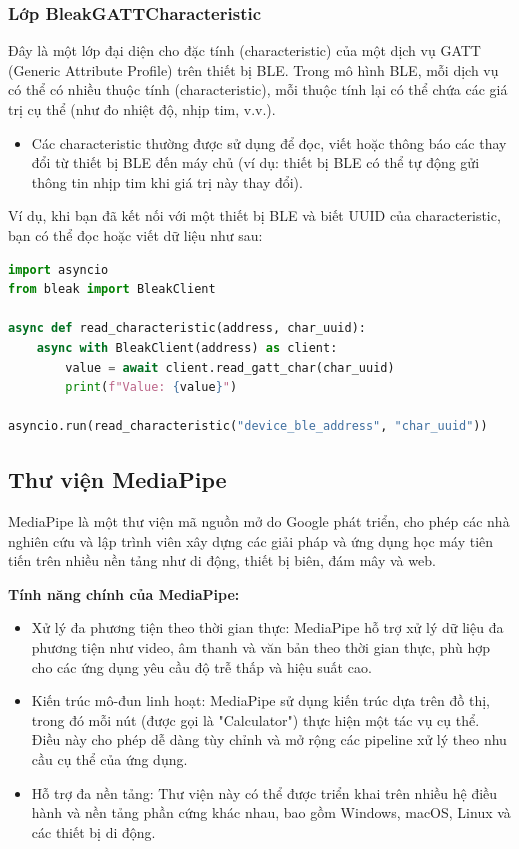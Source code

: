 \subsubsection{Lớp BleakGATTCharacteristic}
Đây là một lớp đại diện cho đặc tính (characteristic) của một dịch vụ GATT (Generic Attribute Profile) trên thiết bị BLE. Trong mô hình BLE, mỗi dịch vụ có thể có nhiều thuộc tính (characteristic), mỗi thuộc tính lại có thể chứa các giá trị cụ thể (như đo nhiệt độ, nhịp tim, v.v.).
\begin{itemize}
    \item Các characteristic thường được sử dụng để đọc, viết hoặc thông báo các thay đổi từ thiết bị BLE đến máy chủ (ví dụ: thiết bị BLE có thể tự động gửi thông tin nhịp tim khi giá trị này thay đổi).
\end{itemize}
Ví dụ, khi bạn đã kết nối với một thiết bị BLE và biết UUID của characteristic, bạn có thể đọc hoặc viết dữ liệu như sau:
\begin{lstlisting}[language=python,caption={Đoạn code mẫu sử dụng lớp BleakGATTCharacteristic}]
import asyncio
from bleak import BleakClient

async def read_characteristic(address, char_uuid):
    async with BleakClient(address) as client:
        value = await client.read_gatt_char(char_uuid)
        print(f"Value: {value}")

asyncio.run(read_characteristic("device_ble_address", "char_uuid"))
\end{lstlisting}

\subsection{Thư viện MediaPipe}
MediaPipe là một thư viện mã nguồn mở do Google phát triển, cho phép các nhà nghiên cứu và lập trình viên xây dựng các giải pháp và ứng dụng học máy tiên tiến trên nhiều nền tảng như di động, thiết bị biên, đám mây và web.

\textbf{Tính năng chính của MediaPipe:}

\begin{itemize}
    \item Xử lý đa phương tiện theo thời gian thực: MediaPipe hỗ trợ xử lý dữ liệu đa phương tiện như video, âm thanh và văn bản theo thời gian thực, phù hợp cho các ứng dụng yêu cầu độ trễ thấp và hiệu suất cao.
    \item Kiến trúc mô-đun linh hoạt: MediaPipe sử dụng kiến trúc dựa trên đồ thị, trong đó mỗi nút (được gọi là "Calculator") thực hiện một tác vụ cụ thể. Điều này cho phép dễ dàng tùy chỉnh và mở rộng các pipeline xử lý theo nhu cầu cụ thể của ứng dụng. \cite{mediapipe}
    \item Hỗ trợ đa nền tảng: Thư viện này có thể được triển khai trên nhiều hệ điều hành và nền tảng phần cứng khác nhau, bao gồm Windows, macOS, Linux và các thiết bị di động.
\end{itemize}

